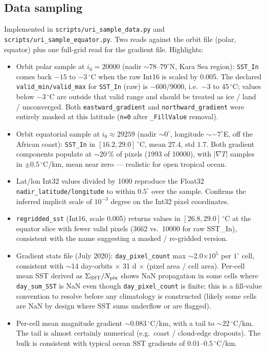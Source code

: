 \documentclass[11pt]{article}
\begin{document}
\subsection{Data sampling}

Implemented in \texttt{scripts/uri\_sample\_data.py} and
\texttt{scripts/uri\_sample\_equator.py}. Two reads against the orbit
file (polar, equator) plus one full-grid read for the gradient file.
Highlights:

\begin{itemize}
  \item Orbit polar sample at $i_0=20000$ (nadir $\sim 78\text{--}79^\circ$N,
    Kara Sea region): \texttt{SST\_In} comes back $-15$ to $-3\,^\circ$C
    when the raw Int16 is scaled by 0.005. The declared
    \texttt{valid\_min/valid\_max} for \texttt{SST\_In} (raw) is
    $-600/9000$, i.e.\ $-3$ to $45\,^\circ$C; values below $-3\,^\circ$C
    are outside that valid range and should be treated as ice / land
    / unconverged. Both \texttt{eastward\_gradient} and
    \texttt{northward\_gradient} were entirely masked at this
    latitude (\texttt{n=0} after \texttt{\_FillValue} removal).
  \item Orbit equatorial sample at $i_0 \approx 29259$
    (nadir $\sim 0^\circ$, longitude $\sim -7^\circ$E, off the
    African coast): \texttt{SST\_In} in $[16.2, 29.0]\,^\circ$C,
    mean $27.4$, std $1.7$. Both gradient components populate at
    $\sim$20\,\% of pixels (1993 of 10000), with $|\nabla T|$
    samples in $\pm 0.5\,^\circ$C/km, mean near zero --- realistic
    for open tropical ocean.
  \item Lat/lon Int32 values divided by 1000 reproduce the
    Float32 \texttt{nadir\_latitude/longitude} to within $0.5^\circ$
    over the sample. Confirms the inferred implicit scale of
    $10^{-3}$ degree on the Int32 pixel coordinates.
  \item \texttt{regridded\_sst} (Int16, scale 0.005) returns values
    in $[26.8, 29.0]\,^\circ$C at the equator slice with fewer valid
    pixels (3662 vs.\ 10000 for raw SST\_In), consistent with the
    name suggesting a masked / re-gridded version.
  \item Gradient stats file (July 2020):
    \texttt{day\_pixel\_count} max $\sim$2.0$\times 10^5$ per
    $1^\circ$ cell, consistent with $\sim$14 day-orbits $\times$
    31 d $\times$ (pixel area / cell area). Per-cell mean SST
    derived as $\Sigma_{\rm SST}/N_{\rm pix}$ shows NaN propagation
    in some cells where \texttt{day\_sum\_SST} is NaN even though
    \texttt{day\_pixel\_count} is finite; this is a fill-value
    convention to resolve before any climatology is constructed
    (likely some cells are NaN by design where SST sums underflow
    or are flagged).
  \item Per-cell mean magnitude gradient $\sim 0.083\,^\circ$C/km,
    with a tail to $\sim 22\,^\circ$C/km. The tail is almost
    certainly numerical (e.g.\ coast / cloud-edge dropouts). The
    bulk is consistent with typical ocean SST gradients of
    $0.01\text{--}0.5\,^\circ$C/km.
\end{itemize}
\end{document}

